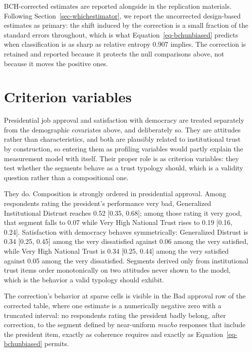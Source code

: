 \documentclass[
  12pt]{article}
\begin{document}
BCH-corrected estimates are reported alongside in the replication
materials. Following Section~\ref{sec-whichestimator}, we report the
uncorrected design-based estimates as primary: the shift induced by the
correction is a small fraction of the standard errors throughout, which
is what Equation~\ref{eq-bchunbiased} predicts when classification is as
sharp as relative entropy 0.907 implies. The correction is retained and
reported because it protects the null comparisons above, not because it
moves the positive ones.

\section{Criterion variables}\label{sec-results-criterion}

Presidential job approval and satisfaction with democracy are treated
separately from the demographic covariates above, and deliberately so.
They are attitudes rather than characteristics, and both are plausibly
related to institutional trust by construction, so entering them as
profiling variables would partly explain the measurement model with
itself. Their proper role is as criterion variables: they test whether
the segments behave as a trust typology should, which is a validity
question rather than a compositional one.

They do. Composition is strongly ordered in presidential approval. Among
respondents rating the president's performance very bad, Generalized
Institutional Distrust reaches 0.52 {[}0.35, 0.68{]}; among those rating
it very good, that segment falls to 0.07 while Very High National Trust
rises to 0.19 {[}0.16, 0.24{]}. Satisfaction with democracy behaves
symmetrically: Generalized Distrust is 0.34 {[}0.25, 0.45{]} among the
very dissatisfied against 0.06 among the very satisfied, while Very High
National Trust is 0.34 {[}0.25, 0.44{]} among the very satisfied against
0.05 among the very dissatisfied. Segments derived only from
institutional trust items order monotonically on two attitudes never
shown to the model, which is the behavior a valid typology should
exhibit.

The correction's behavior at sparse cells is visible in the Bad approval
row of the corrected table, where one estimate is a numerically negative
zero with a truncated interval: no respondents rating the president
badly belong, after correction, to the segment defined by near-uniform
\emph{mucho} responses that include the president item, exactly as
coherence requires and exactly as Equation~\ref{eq-bchunbiased} permits.
\end{document}
